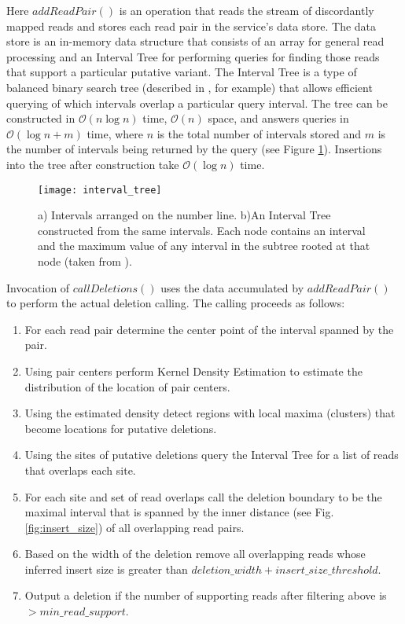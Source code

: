 Here $addReadPair()$ is an operation that reads the stream of discordantly mapped reads and stores each read pair in the service's data store. The data store is an in-memory data structure that consists of an array for general read processing and an Interval Tree for performing queries for finding those reads that support a particular putative variant. The Interval Tree is a type of balanced binary search tree (described in \autocite{cormen2009introduction}, for example) that allows efficient querying of which intervals overlap a particular query interval. The tree can be constructed in $\mathcal{O}(n\log{}n)$ time, $\mathcal{O}(n)$ space, and answers queries in $\mathcal{O}(\log{}n + m)$ time, where $n$ is the total number of intervals stored and $m$ is the number of intervals being returned by the query (see Figure \ref{fig:interval_tree}). Insertions into the tree after construction take $\mathcal{O}(\log{}n)$ time.

\begin{figure}[H]
    \texttt{[image: interval\_tree]}
    \centering
    \caption {a) Intervals arranged on the number line. b)An Interval Tree constructed from the same intervals. Each node contains an interval and the maximum value of any interval in the subtree rooted at that node (taken from \autocite{cormen2009introduction}).}
    \label{fig:interval_tree}
\end{figure}

Invocation of $callDeletions()$ uses the data accumulated by $addReadPair()$ to perform the actual deletion calling. The calling proceeds as follows:

\begin{enumerate}
    \item For each read pair determine the center point of the interval spanned by the pair.
    \item Using pair centers perform Kernel Density Estimation\autocites{rosenblatt1956remarks}{parzen1962estimation} to estimate the distribution of the location of pair centers.
    \item Using the estimated density detect regions with local maxima (clusters) that become locations for putative deletions.
    \item Using the sites of putative deletions query the Interval Tree for a list of reads that overlaps each site.
    \item For each site and set of read overlaps call the deletion boundary to be the maximal interval that is spanned by the inner distance (see Fig. \ref{fig:insert_size}) of all overlapping read pairs.
    \item Based on the width of the deletion remove all overlapping reads whose inferred insert size is greater than $deletion\_width + insert\_size\_threshold$.
    \item Output a deletion if the number of supporting reads after filtering above is $> min\_read\_support$.
\end{enumerate}

